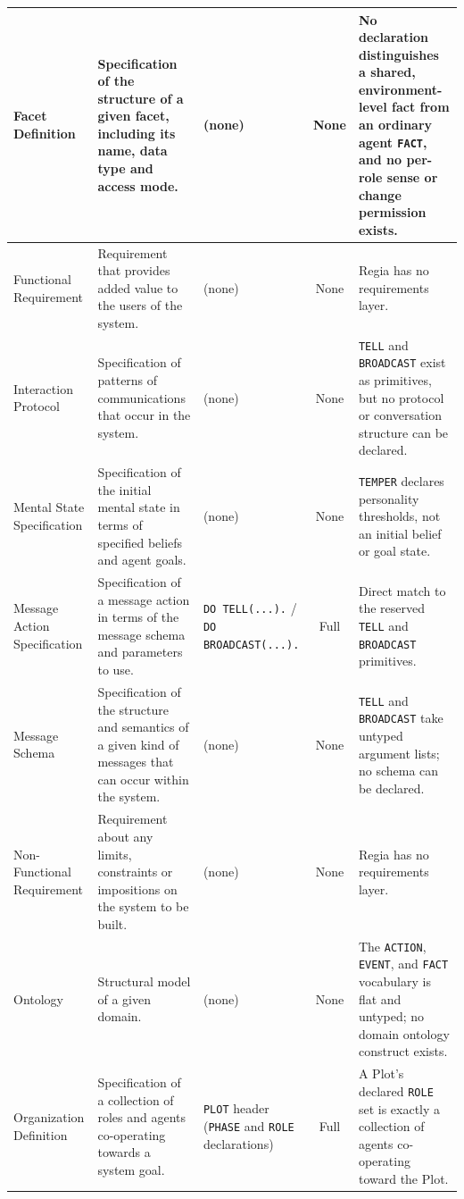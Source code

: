 \begin{longtable}{|p{}|p{}|p{}|c|p{}|}
Facet Definition &
Specification of the structure of a given facet, including its name, data type and access mode. &
(none) &
None &
No declaration distinguishes a shared, environment-level fact from an ordinary agent \lstinline|FACT|, and no per-role sense or change permission exists. \\
\hline

Functional Requirement &
Requirement that provides added value to the users of the system. &
(none) &
None &
Regia has no requirements layer. \\
\hline

Interaction Protocol &
Specification of patterns of communications that occur in the system. &
(none) &
None &
\lstinline|TELL| and \lstinline|BROADCAST| exist as primitives, but no protocol or conversation structure can be declared. \\
\hline

Mental State Specification &
Specification of the initial mental state in terms of specified beliefs and agent goals. &
(none) &
None &
\lstinline|TEMPER| declares personality thresholds, not an initial belief or goal state. \\
\hline

Message Action Specification &
Specification of a message action in terms of the message schema and parameters to use. &
\lstinline|DO TELL(...).| / \lstinline|DO BROADCAST(...).| &
Full &
Direct match to the reserved \lstinline|TELL| and \lstinline|BROADCAST| primitives. \\
\hline

Message Schema &
Specification of the structure and semantics of a given kind of messages that can occur within the system. &
(none) &
None &
\lstinline|TELL| and \lstinline|BROADCAST| take untyped argument lists; no schema can be declared. \\
\hline

Non-Functional Requirement &
Requirement about any limits, constraints or impositions on the system to be built. &
(none) &
None &
Regia has no requirements layer. \\
\hline

Ontology &
Structural model of a given domain. &
(none) &
None &
The \lstinline|ACTION|, \lstinline|EVENT|, and \lstinline|FACT| vocabulary is flat and untyped; no domain ontology construct exists. \\
\hline

Organization Definition &
Specification of a collection of roles and agents co-operating towards a system goal. &
\lstinline|PLOT| header (\lstinline|PHASE| and \lstinline|ROLE| declarations) &
Full &
A Plot's declared \lstinline|ROLE| set is exactly a collection of agents co-operating toward the Plot. \\
\hline


\end{longtable}
